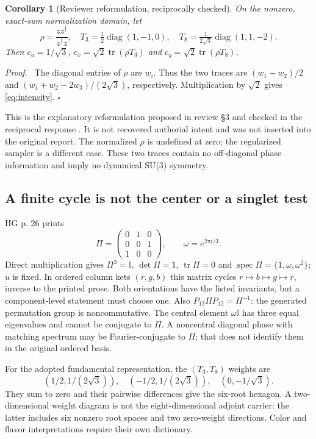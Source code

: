 \documentclass[11pt,a4paper]{article}
\numberwithin{equation}{section}
\newtheorem{corollary}[proposition]{Corollary}
\newenvironment{proof}{\par\noindent\textit{Proof.}\ }{\hfill$\square$\par}
\newcommand{\tr}{\operatorname{tr}}\newcommand{\diag}{\operatorname{diag}}
\newcommand{\spec}{\operatorname{spec}}\newcommand{\im}{\operatorname{Im}}
\newcommand{\I}{\mathbb I}\newcommand{\Argz}{\operatorname{Arg}_0}
\begin{document}
\begin{corollary}[Reviewer reformulation, reciprocally checked]\label{prop:cartan}
On the nonzero, exact-sum normalization domain, let
\begin{equation}
 \rho=\frac{zz^\dagger}{z^\dagger z},\quad
 T_3=\tfrac12\diag(1,-1,0),\quad T_8=\tfrac1{2\sqrt3}\diag(1,1,-2).
\end{equation}
Then $c_u=1/\sqrt3$, $c_x=\sqrt2\tr(\rho T_3)$ and $c_y=\sqrt2\tr(\rho T_8)$.
\end{corollary}
\begin{proof}
The diagonal entries of $\rho$ are $w_i$. Thus the two traces are $(w_1-w_2)/2$ and $(w_1+w_2-2w_3)/(2\sqrt3)$, respectively. Multiplication by $\sqrt2$ gives \eqref{eq:intensity}.
\end{proof}
This is the explanatory reformulation proposed in review \S3 and checked in the reciprocal response \cite{review,response}. It is not recovered authorial intent and was not inserted into the original report. The normalized $\rho$ is undefined at zero; the regularized sampler is a different case. These two traces contain no off-diagonal phase information and imply no dynamical SU(3) symmetry.

\subsection{A finite cycle is not the center or a singlet test}\label{sec:cycle}
HG p. 26 prints
\begin{equation}\label{eq:cycle}
 \Pi=\begin{pmatrix}0&1&0\\0&0&1\\1&0&0\end{pmatrix},\qquad
 \omega=e^{2\pi i/3}.
\end{equation}
Direct multiplication gives $\Pi^3=\I$, $\det\Pi=1$, $\tr\Pi=0$ and $\spec\Pi=\{1,\omega,\omega^2\}$; $u$ is fixed. In ordered column kets $(r,g,b)$ this matrix cycles $r\mapsto b\mapsto g\mapsto r$, inverse to the printed prose. Both orientations have the listed invariants, but a component-level statement must choose one. Also $P_{12}\Pi P_{12}=\Pi^{-1}$: the generated permutation group is noncommutative. The central element $\omega\I$ has three equal eigenvalues and cannot be conjugate to $\Pi$. A noncentral diagonal phase with matching spectrum may be Fourier-conjugate to $\Pi$; that does not identify them in the original ordered basis.

For the adopted fundamental representation, the $(T_3,T_8)$ weights are
\begin{equation}
 (1/2,1/(2\sqrt3)),\quad(-1/2,1/(2\sqrt3)),\quad(0,-1/\sqrt3).
\end{equation}
They sum to zero and their pairwise differences give the six-root hexagon. A two-dimensional weight diagram is not the eight-dimensional adjoint carrier: the latter includes six nonzero root spaces and two zero-weight directions. Color and flavor interpretations require their own dictionary.
\end{document}
